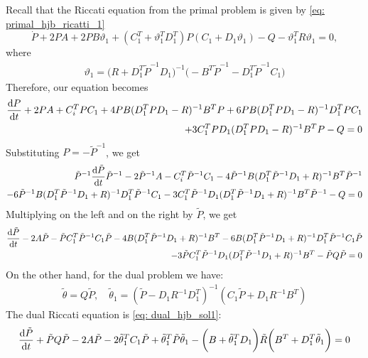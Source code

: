 Recall that the Riccati equation from the primal problem is given by \eqref{eq: primal_hjb_ricatti_1}
\begin{equation*}
     \dot{P}  +  2P A + 2P B \vartheta_1 + (C_1^T + \vartheta_1^T D_1^T)P(C_1 + D_1 \vartheta_1) 
     -  Q -  \vartheta_1^T R \vartheta_1 = 0,
\end{equation*}
where 
\begin{align*}
    \vartheta_1 = \bigg(R +  D_1^T  \tilde{P}^{-1} D_1\bigg)^{-1} \bigg( - B^T  \tilde{P}^{-1} - D_1^T  \tilde{P}^{-1} C_1 \bigg)
\end{align*}
Therefore, our equation becomes
\begin{align*}
    \frac{\mathrm{d} P}{\mathrm{d} t} + 2PA + C_i^T P C_1 + 4PB(D_1^T P D_1 - R)^{-1} B^T P + 6PB(D_1^T P D_1 - R)^{-1} D_1^T P C_1\\
    + 3C_1^T P D_1 (D_1^T P D_1 - R)^{-1} B^T P - Q = 0
\end{align*}
Substituting $P = - \tilde{P}^{-1}$, we get 
\begin{align*}
    \tilde{P}^{-1} \frac{\mathrm{d} \tilde{P}}{\mathrm{d} t} \tilde{P}^{-1} - 2\tilde{P}^{-1}A - C_i^T \tilde{P}^{-1} C_1 - 4\tilde{P}^{-1}B(D_1^T \tilde{P}^{-1} D_1 + R)^{-1} B^T \tilde{P}^{-1}\\
    - 6\tilde{P}^{-1} B(D_1^T \tilde{P}^{-1} D_1 + R)^{-1} D_1^T \tilde{P}^{-1} C_1
    - 3C_1^T \tilde{P}^{-1} D_1 (D_1^T \tilde{P}^{-1} D_1 + R)^{-1} B^T \tilde{P}^{-1} - Q = 0
\end{align*}
Multiplying on the left and on the right by $\tilde{P}$, we get 
\begin{align*}
    \frac{\mathrm{d} \tilde{P}}{\mathrm{d} t} - 2A\tilde{P} - \tilde{P}C_1^T \tilde{P}^{-1} C_1 \tilde{P} - 4B(D_1^T \tilde{P}^{-1} D_1  + R)^{-1} B^T 
    - 6 B(D_1^T \tilde{P}^{-1} D_1 + R)^{-1} D_1^T \tilde{P}^{-1} C_1 \tilde{P}\\
    - 3 \tilde{P} C_1^T \tilde{P}^{-1} D_1 (D_1^T \tilde{P}^{-1} D_1 + R)^{-1} B^T  - \tilde{P}Q\tilde{P} = 0
\end{align*}
On the other hand, for the dual problem we have:
\begin{align*}
    \tilde{\theta} = Q \tilde{P}, \quad \tilde{\theta}_1 = (\tilde{P} - D_1 R^{-1} D_1^T)^{-1} (C_1 \tilde{P} + D_1 R^{-1}B^T)
\end{align*}
The dual Riccati equation is \eqref{eq: dual_hjb_sol1}:
\begin{align*}
     \frac{\mathrm{d} \tilde{P}}{\mathrm{d} t} + \tilde{P}Q \tilde{P} -2 A \tilde{P}  - 2 \tilde{\theta}_1^T C_1 \tilde{P} +  \tilde{\theta}_1^T \tilde{P} \tilde{\theta}_1
    - \bigg(B +\tilde{\theta}_1^T D_1\bigg) \tilde{R} \bigg(B^T + D_1^T \tilde{\theta}_1\bigg) = 0
\end{align*}
